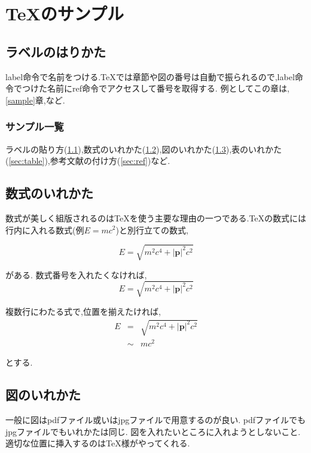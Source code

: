 \chapter{\TeX のサンプル} \label{sec:sample}

\section{ラベルのはりかた}\label{sec:label}
label命令で名前をつける.\TeX では章節や図の番号は自動で振られるので,label命令でつけた名前にref命令でアクセスして番号を取得する.
例としてこの章は,\ref{sample}章,など.

\subsection{サンプル一覧}\label{sec:list}
ラベルの貼り方(\ref{sec:label}),数式のいれかた(\ref{sec:eq}),図のいれかた(\ref{sec:figure}),表のいれかた(\ref{sec:table}),参考文献の付け方(\ref{sec:ref})など.

\section{数式のいれかた}\label{sec:eq}
数式が美しく組版されるのは\TeX を使う主要な理由の一つである.\TeX の数式には行内に入れる数式(例$E=mc^2$)と別行立ての数式,

\begin{equation}
	E = \sqrt{m^2 c^4 +|\bm{p}|^2 c^2}
\end{equation}

がある.
数式番号を入れたくなければ,
\begin{equation}
	\nonumber
	E = \sqrt{m^2 c^4 +|\bm{p}|^2 c^2}
\end{equation}

複数行にわたる式で,位置を揃えたければ,
\begin{eqnarray}
	\nonumber
	E & =    & \sqrt{m^2 c^4 +|\bm{p}|^2 c^2} \\
	  & \sim & mc^2
\end{eqnarray}

とする.

\section{図のいれかた}\label{sec:figure}

一般に図はpdfファイル或いはjpgファイルで用意するのが良い.
pdfファイルでもjpgファイルでもいれかたは同じ.
図を入れたいところに入れようとしないこと.
適切な位置に挿入するのは\TeX 様がやってくれる.


